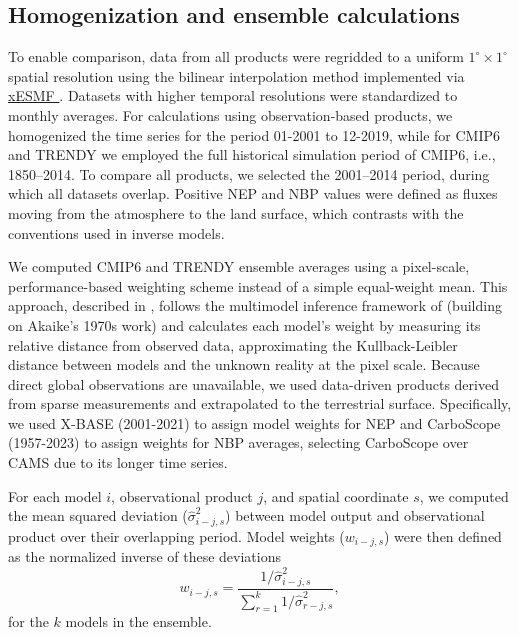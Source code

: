 \documentclass[ProofPDF]{./Styles/Jnls-Template-V3}
\begin{document}

\subsection{Homogenization and ensemble calculations}
To enable comparison, data from all products were regridded to a uniform $1^\circ\times1^\circ$ spatial resolution using the bilinear interpolation method implemented via \hyperlink{https://xesmf.readthedocs.io/}{xESMF \citep{zhuang2023}}. Datasets with higher temporal resolutions were standardized to monthly averages. For calculations using observation-based products, we homogenized the time series for the period 01-2001 to 12-2019, while for CMIP6 and TRENDY we employed the full historical simulation period of CMIP6, i.e., 1850--2014. To compare all products, we selected the 2001--2014 period, during which all datasets overlap.
Positive NEP and NBP values were defined as fluxes moving from the atmosphere to the land surface, which contrasts with the conventions used in inverse models.

We computed CMIP6 and TRENDY ensemble averages using a pixel-scale, performance-based weighting scheme instead of a simple equal-weight mean. This approach, described in \citet{Sierra2025GDM}, follows the multimodel inference framework of \citet{Burnham2002} (building on Akaike’s 1970s work) and calculates each model's weight by measuring its relative distance from observed data, approximating the Kullback-Leibler distance between models and the unknown reality at the pixel scale. Because direct global observations are unavailable, we used data-driven products derived from sparse measurements and extrapolated to the terrestrial surface. Specifically, we used X-BASE (2001-2021) to assign model weights for NEP and CarboScope (1957-2023) to assign weights for NBP averages, selecting CarboScope over CAMS due to its longer time series. 
 
For each model $i$, observational product $j$, and spatial coordinate $s$, we computed the mean squared deviation ($\hat\sigma^2_{i-j, s}$) between model output and  observational product over their overlapping period. Model weights ($w_{i-j, s}$) were then defined as the normalized inverse of these deviations
\begin{equation}
    w_{i-j, s}=\frac{1/\hat\sigma^2_{i-j, s}}{\sum^k_{r=1}1/\hat\sigma^2_{r-j, s}},
\end{equation}
for the $k$ models in the ensemble. 
\end{document}
